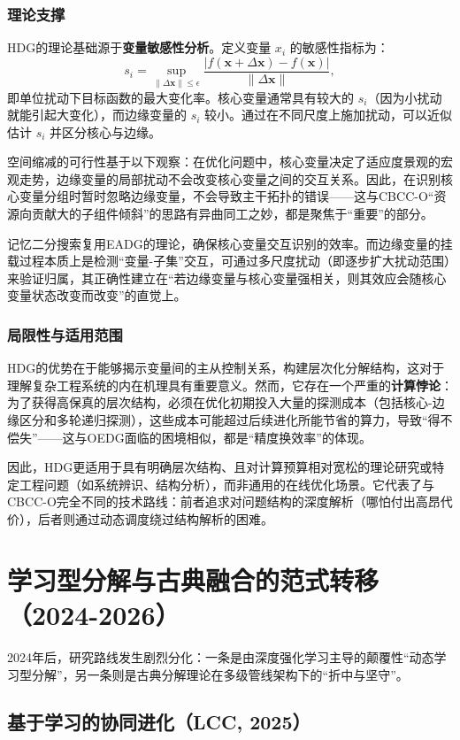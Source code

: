 \subsubsection{理论支撑}
HDG的理论基础源于\textbf{变量敏感性分析}。定义变量 $x_i$ 的敏感性指标为：
\[
s_i = \sup_{\|\Delta \mathbf{x}\| \leq \epsilon} \frac{|f(\mathbf{x}+\Delta \mathbf{x}) - f(\mathbf{x})|}{\|\Delta \mathbf{x}\|},
\]
即单位扰动下目标函数的最大变化率。核心变量通常具有较大的 $s_i$（因为小扰动就能引起大变化），而边缘变量的 $s_i$ 较小。通过在不同尺度上施加扰动，可以近似估计 $s_i$ 并区分核心与边缘。

空间缩减的可行性基于以下观察：在优化问题中，核心变量决定了适应度景观的宏观走势，边缘变量的局部扰动不会改变核心变量之间的交互关系。因此，在识别核心变量分组时暂时忽略边缘变量，不会导致主干拓扑的错误——这与CBCC-O“资源向贡献大的子组件倾斜”的思路有异曲同工之妙，都是聚焦于“重要”的部分。

记忆二分搜索复用EADG的理论，确保核心变量交互识别的效率。而边缘变量的挂载过程本质上是检测“变量-子集”交互，可通过多尺度扰动（即逐步扩大扰动范围）来验证归属，其正确性建立在“若边缘变量与核心变量强相关，则其效应会随核心变量状态改变而改变”的直觉上。

\subsubsection{局限性与适用范围}
HDG的优势在于能够揭示变量间的主从控制关系，构建层次化分解结构，这对于理解复杂工程系统的内在机理具有重要意义。然而，它存在一个严重的\textbf{计算悖论}：为了获得高保真的层次结构，必须在优化初期投入大量的探测成本（包括核心-边缘区分和多轮递归探测），这些成本可能超过后续进化所能节省的算力，导致“得不偿失”——这与OEDG面临的困境相似，都是“精度换效率”的体现。

因此，HDG更适用于具有明确层次结构、且对计算预算相对宽松的理论研究或特定工程问题（如系统辨识、结构分析），而非通用的在线优化场景。它代表了与CBCC-O完全不同的技术路线：前者追求对问题结构的深度解析（哪怕付出高昂代价），后者则通过动态调度绕过结构解析的困难。

\section{学习型分解与古典融合的范式转移（2024-2026）}

2024年后，研究路线发生剧烈分化：一条是由深度强化学习主导的颠覆性“动态学习型分解”，另一条则是古典分解理论在多级管线架构下的“折中与坚守”。

\subsection{基于学习的协同进化（LCC, 2025）}

